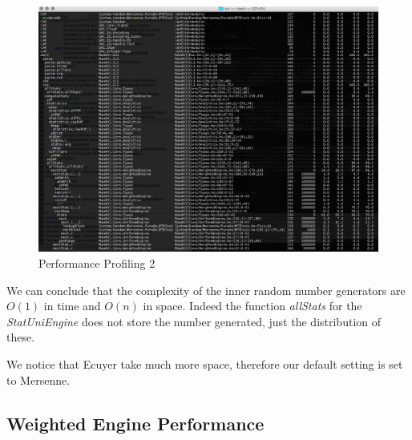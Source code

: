 \documentclass[12pt,a4paper,article]{memoir} %
\begin{document}
\begin{figure}[h!]
\begin{center}
\includegraphics[width=1\textwidth]{img/prof2.png}
\caption{Performance Profiling 2}
\label{fig:perf2}
\end{center}
\end{figure}
We can conclude that the complexity of the inner random number generators
are $O(1)$ in time and $O(n)$ in space. Indeed the function \emph{allStats} for the
\emph{StatUniEngine} does not store the number generated, 
just the distribution of these.

We notice that Ecuyer take much more space, therefore our default setting
is set to Mersenne.

\subsection{Weighted Engine Performance}
\end{document}
